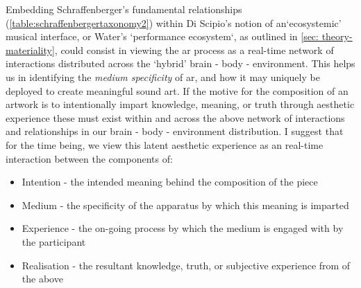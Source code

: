 Embedding Schraffenberger's fundamental relationships (\autoref{table:schraffenbergertaxonomy2}) within Di Scipio's notion of an`ecosystemic' musical interface, or Water's `performance ecosystem`, as outlined in \autoref{sec: theory-materiality}, could consist in viewing the \gls{ar} process as a real-time network of interactions distributed across the `hybrid' brain - body - environment. This helps us in identifying the \textit{medium specificity} of \gls{ar}, and how it may uniquely be deployed to create meaningful sound \gls{art}. If the motive for the composition of an artwork is to intentionally impart knowledge, meaning, or truth through aesthetic experience these must exist within and across the above network of interactions and relationships in our brain - body - environment distribution. I suggest that for the time being, we view this latent aesthetic experience as an real-time interaction between the components of:
\begin{itemize}
    \item Intention - the intended meaning behind the composition of the piece
    \item Medium - the specificity of the apparatus by which this meaning is imparted
    \item Experience - the on-going process by which the medium is engaged with by the participant
    \item Realisation - the resultant knowledge, truth, or subjective experience from of the above
\end{itemize}

